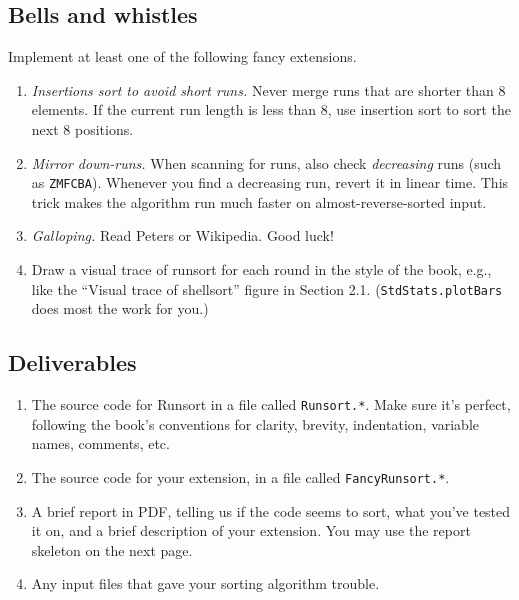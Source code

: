 \documentclass{tufte-handout}
\begin{document}
\subsection{Bells and whistles}
Implement at least one of the following fancy extensions.
\begin{enumerate}
\item \emph{Insertions sort to avoid short runs.}
  Never merge runs that are shorter than 8 elements.
  If the current run length is less than 8,
  use insertion sort to sort the next 8 positions.
\item \emph{Mirror down-runs.}
  When scanning for runs, also check \emph{decreasing} runs (such as \texttt{ZMFCBA}).
  Whenever you find a decreasing run, revert it in linear time.
  This trick makes the algorithm run much faster on almost-reverse-sorted input.
\item \emph{Galloping.} Read Peters or Wikipedia. Good luck!
\item Draw a visual trace of runsort for each round in the style of the book, e.g., like the ``Visual trace of shellsort'' figure in Section 2.1.
  (\texttt{StdStats.plotBars} does most the work for you.)
\end{enumerate}

\subsection{Deliverables}

\begin{enumerate}
  \item The source code for Runsort in a file called {\tt Runsort.*}.
      Make sure it's perfect, following the book's conventions for clarity, brevity, indentation, variable names, comments, etc.
  \item The source code for your extension, in a file called {\tt FancyRunsort.*}.
  \item A brief report in PDF, telling us if the code seems to sort, what you've tested it on, and a brief description of your extension.
  You may use the report skeleton on the next page.
  \item Any input files that gave your sorting algorithm trouble.
\end{enumerate}
\end{document}
